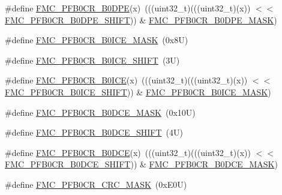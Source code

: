 \begin{DoxyCompactItemize}
\item 
\#define \mbox{\hyperlink{group___f_m_c___register___masks_gaa9a868df0189cdc8930a696737661ea4}{F\+M\+C\+\_\+\+P\+F\+B0\+C\+R\+\_\+\+B0\+D\+PE}}(x)~(((uint32\+\_\+t)(((uint32\+\_\+t)(x)) $<$$<$ \mbox{\hyperlink{group___f_m_c___register___masks_gabe5b35383e6d2198f45bc66429b0ce61}{F\+M\+C\+\_\+\+P\+F\+B0\+C\+R\+\_\+\+B0\+D\+P\+E\+\_\+\+S\+H\+I\+FT}})) \& \mbox{\hyperlink{group___f_m_c___register___masks_gaff35af9c8bc3c5cf2f6bf9dd76253a02}{F\+M\+C\+\_\+\+P\+F\+B0\+C\+R\+\_\+\+B0\+D\+P\+E\+\_\+\+M\+A\+SK}})
\item 
\#define \mbox{\hyperlink{group___f_m_c___register___masks_ga093ec774220ef7557784c2cea999502e}{F\+M\+C\+\_\+\+P\+F\+B0\+C\+R\+\_\+\+B0\+I\+C\+E\+\_\+\+M\+A\+SK}}~(0x8\+U)
\item 
\#define \mbox{\hyperlink{group___f_m_c___register___masks_ga7595313d5ea6aa0ddb4fa755bad06110}{F\+M\+C\+\_\+\+P\+F\+B0\+C\+R\+\_\+\+B0\+I\+C\+E\+\_\+\+S\+H\+I\+FT}}~(3\+U)
\item 
\#define \mbox{\hyperlink{group___f_m_c___register___masks_ga9d640081bb0aa626c47858ddc673ae41}{F\+M\+C\+\_\+\+P\+F\+B0\+C\+R\+\_\+\+B0\+I\+CE}}(x)~(((uint32\+\_\+t)(((uint32\+\_\+t)(x)) $<$$<$ \mbox{\hyperlink{group___f_m_c___register___masks_ga7595313d5ea6aa0ddb4fa755bad06110}{F\+M\+C\+\_\+\+P\+F\+B0\+C\+R\+\_\+\+B0\+I\+C\+E\+\_\+\+S\+H\+I\+FT}})) \& \mbox{\hyperlink{group___f_m_c___register___masks_ga093ec774220ef7557784c2cea999502e}{F\+M\+C\+\_\+\+P\+F\+B0\+C\+R\+\_\+\+B0\+I\+C\+E\+\_\+\+M\+A\+SK}})
\item 
\#define \mbox{\hyperlink{group___f_m_c___register___masks_ga2ef77cab94225466d9301d03fc02b432}{F\+M\+C\+\_\+\+P\+F\+B0\+C\+R\+\_\+\+B0\+D\+C\+E\+\_\+\+M\+A\+SK}}~(0x10\+U)
\item 
\#define \mbox{\hyperlink{group___f_m_c___register___masks_gaf25cde827cdccda0268d84a381fb8ab2}{F\+M\+C\+\_\+\+P\+F\+B0\+C\+R\+\_\+\+B0\+D\+C\+E\+\_\+\+S\+H\+I\+FT}}~(4\+U)
\item 
\#define \mbox{\hyperlink{group___f_m_c___register___masks_ga8d3548cde9ffc9f27b7cfc31d3160c12}{F\+M\+C\+\_\+\+P\+F\+B0\+C\+R\+\_\+\+B0\+D\+CE}}(x)~(((uint32\+\_\+t)(((uint32\+\_\+t)(x)) $<$$<$ \mbox{\hyperlink{group___f_m_c___register___masks_gaf25cde827cdccda0268d84a381fb8ab2}{F\+M\+C\+\_\+\+P\+F\+B0\+C\+R\+\_\+\+B0\+D\+C\+E\+\_\+\+S\+H\+I\+FT}})) \& \mbox{\hyperlink{group___f_m_c___register___masks_ga2ef77cab94225466d9301d03fc02b432}{F\+M\+C\+\_\+\+P\+F\+B0\+C\+R\+\_\+\+B0\+D\+C\+E\+\_\+\+M\+A\+SK}})
\item 
\#define \mbox{\hyperlink{group___f_m_c___register___masks_ga2ba15c609c4ff7e43ed4d6119b704ddd}{F\+M\+C\+\_\+\+P\+F\+B0\+C\+R\+\_\+\+C\+R\+C\+\_\+\+M\+A\+SK}}~(0x\+E0\+U)
$$
\end{DoxyCompactItemize}
